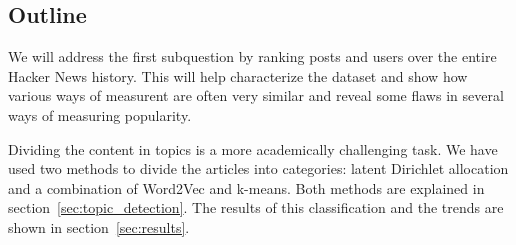 \subsection{Outline}
We will address the first subquestion by ranking posts and users over the entire Hacker News history. This will help characterize the dataset and show how various ways of measurent are often very similar and reveal some flaws in several ways of measuring popularity.

Dividing the content in topics is a more academically challenging task. We have used two methods to divide the articles into categories: latent Dirichlet allocation and a combination of Word2Vec and k-means. Both methods are explained in section~\ref{sec:topic_detection}. The results of this classification and the trends are shown in section~\ref{sec:results}.